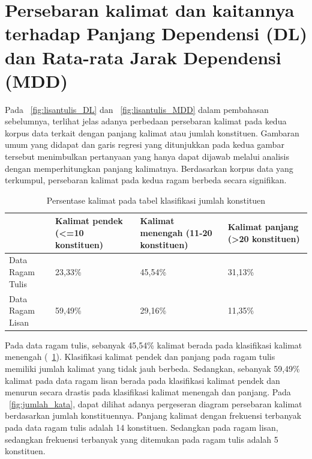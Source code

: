 \section{Persebaran kalimat dan kaitannya terhadap Panjang Dependensi (DL) dan Rata-rata Jarak Dependensi (MDD)}

Pada \pic~\ref{fig:lisantulis_DL}  dan \pic~\ref{fig:lisantulis_MDD} dalam pembahasan sebelumnya, terlihat jelas adanya perbedaan persebaran kalimat pada kedua korpus data terkait dengan panjang kalimat atau jumlah konstituen. Gambaran umum yang didapat dan garis regresi yang ditunjukkan pada kedua gambar tersebut menimbulkan pertanyaan yang hanya dapat dijawab melalui analisis dengan memperhitungkan panjang kalimatnya. Berdasarkan korpus data yang terkumpul, persebaran kalimat pada kedua ragam berbeda secara signifikan. 

\begin{table}
\begin{center}
\begin{small}
   \caption{Persentase kalimat pada tabel klasifikasi jumlah konstituen}  \label{tab:presentase_kalimat}
  \begin{tabular}{ |p{3cm} | p{3cm} | p{3cm} | p{3cm} |}
    \hline
 & Kalimat pendek \newline (\textless=10 konstituen) & Kalimat menengah (11-20 konstituen) & Kalimat panjang (\textgreater20 konstituen) \\ \hline
Data Ragam Tulis & 23,33\% & 45,54\% & 31,13\% \\ \hline
Data Ragam Lisan & 59,49\% & 29,16\% & 11,35\% \\ \hline
  \end{tabular}
  \end{small}
\end{center}
\end{table}

Pada data ragam tulis, sebanyak 45,54\% kalimat berada pada klasifikasi kalimat menengah (\tab~\ref{tab:presentase_kalimat}). Klasifikasi kalimat pendek dan panjang pada ragam tulis memiliki jumlah kalimat yang tidak jauh berbeda. Sedangkan, sebanyak 59,49\% kalimat pada data ragam lisan berada pada klasifikasi kalimat pendek dan menurun secara drastis pada klasifikasi kalimat menengah dan panjang. Pada \pic~\ref{fig:jumlah_kata}, dapat dilihat adanya pergeseran diagram persebaran kalimat berdasarkan jumlah konstituennya. Panjang kalimat dengan frekuensi terbanyak pada data ragam tulis adalah 14 konstituen. Sedangkan pada ragam lisan, sedangkan frekuensi terbanyak yang ditemukan pada ragam tulis adalah 5 konstituen. 

